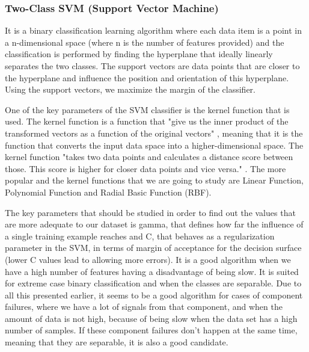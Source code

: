 \subsubsection{Two-Class SVM (Support Vector Machine)}
It is a binary classification learning algorithm where each data item is a point in a n-dimensional space (where n is the number of features provided) and the classification is performed by finding the hyperplane that ideally linearly separates the two classes. The support vectors are data points that are closer to the hyperplane and influence the position and orientation of this hyperplane. Using the support vectors, we maximize the margin of the classifier. \cite{SVM}

One of the key parameters of the SVM classifier is the kernel function that is used. The kernel function is a function that "give us the inner product of the transformed vectors as a function of the original vectors" \cite{FCT_AA}, meaning that it is the function that converts the input data space into a higher-dimensional space. The kernel function "takes two data points and calculates a distance score between those. This score is higher for closer data points and vice versa." \cite{SVM}. The more popular and the kernel functions that we are going to study are Linear Function, Polynomial Function and Radial Basic Function (RBF).

The key parameters that should be studied in order to find out the values that are more adequate to our dataset is gamma, that defines how far the influence of a single training example reaches and C, that behaves as a regularization parameter in the SVM, in terms of margin of acceptance for the decision surface (lower C values lead to allowing more errors).
It is a good algorithm when we have a high number of features having a disadvantage of being slow. It is suited for extreme case binary classification and when the classes are separable.
Due to all this presented earlier, it seems to be a good algorithm for cases of component failures, where we have a lot of signals from that component, and when the amount of data is not high, because of being slow when the data set has a high number of samples. If these component failures don't happen at the same time, meaning that they are separable, it is also a good candidate.

